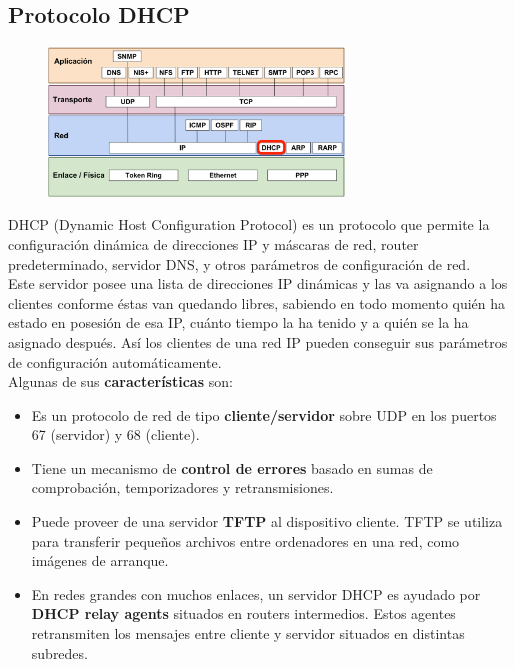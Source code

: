 \begin{onepage}
\section{Protocolo DHCP}
\begin{figure}[H]
    \centering
    \includegraphics[width=0.7\textwidth]{img/DHCP.png}
\end{figure}

DHCP (Dynamic Host Configuration Protocol) es un protocolo que permite la configuración dinámica de direcciones IP y máscaras de red, router predeterminado, servidor DNS, y otros parámetros de configuración de red.\\

Este servidor posee una lista de direcciones IP dinámicas y las va asignando a los clientes conforme éstas van quedando libres, sabiendo en todo momento quién ha estado en posesión de esa IP, cuánto tiempo la ha tenido y a quién se la ha asignado después. Así los clientes de una red IP pueden conseguir sus parámetros de configuración automáticamente.\\

Algunas de sus \textbf{características} son:
\begin{itemize}
    \item Es un protocolo de red de tipo \textbf{cliente/servidor} sobre UDP en los puertos 67 (servidor) y 68
(cliente).
    \item Tiene un mecanismo de \textbf{control de errores} basado en sumas de comprobación, temporizadores y retransmisiones.
    \item Puede proveer de una servidor \textbf{TFTP} al dispositivo cliente. TFTP se utiliza para transferir pequeños archivos entre ordenadores en una red, como imágenes de arranque.
    \item En redes grandes con muchos enlaces, un servidor DHCP es ayudado por \textbf{DHCP relay agents} situados en routers intermedios. Estos agentes retransmiten los mensajes entre cliente y servidor situados en distintas subredes.
\end{itemize}
\end{onepage}

